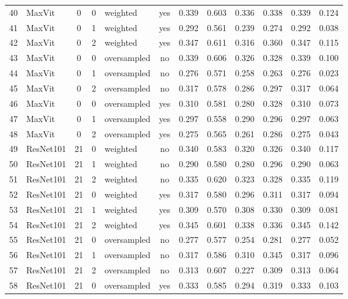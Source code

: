 \documentclass[a4paper,10pt]{book}
\begin{document}
\begin{scriptsize}
\begin{longtable}{@{}l l c c l c c c c c c c@{}}
        40 & MaxVit & 0 & 0 & weighted & yes & 0.339 & 0.603 & 0.336 & 0.338 & 0.339 & 0.124 \\ 
        41 & MaxVit & 0 & 1 & weighted & yes & 0.292 & 0.561 & 0.239 & 0.274 & 0.292 & 0.038 \\ 
        42 & MaxVit & 0 & 2 & weighted & yes & 0.347 & 0.611 & 0.316 & 0.360 & 0.347 & 0.115 \\ 
        43 & MaxVit & 0 & 0 & oversampled & no & 0.339 & 0.606 & 0.326 & 0.328 & 0.339 & 0.100 \\ 
        44 & MaxVit & 0 & 1 & oversampled & no & 0.276 & 0.571 & 0.258 & 0.263 & 0.276 & 0.023 \\ 
        45 & MaxVit & 0 & 2 & oversampled & no & 0.317 & 0.578 & 0.286 & 0.297 & 0.317 & 0.064 \\ 
        46 & MaxVit & 0 & 0 & oversampled & yes & 0.310 & 0.581 & 0.280 & 0.328 & 0.310 & 0.073 \\ 
        47 & MaxVit & 0 & 1 & oversampled & yes & 0.297 & 0.558 & 0.290 & 0.296 & 0.297 & 0.063 \\ 
        48 & MaxVit & 0 & 2 & oversampled & yes & 0.275 & 0.565 & 0.261 & 0.286 & 0.275 & 0.043 \\ 
        49 & ResNet101 & 21 & 0 & weighted & no & 0.340 & 0.583 & 0.320 & 0.326 & 0.340 & 0.117 \\ 
        50 & ResNet101 & 21 & 1 & weighted & no & 0.290 & 0.580 & 0.280 & 0.296 & 0.290 & 0.063 \\ 
        51 & ResNet101 & 21 & 2 & weighted & no & 0.335 & 0.620 & 0.323 & 0.328 & 0.335 & 0.119 \\ 
        52 & ResNet101 & 21 & 0 & weighted & yes & 0.317 & 0.580 & 0.296 & 0.311 & 0.317 & 0.094 \\ 
        53 & ResNet101 & 21 & 1 & weighted & yes & 0.309 & 0.570 & 0.308 & 0.330 & 0.309 & 0.081 \\ 
        54 & ResNet101 & 21 & 2 & weighted & yes & 0.345 & 0.601 & 0.338 & 0.336 & 0.345 & 0.142 \\ 
        55 & ResNet101 & 21 & 0 & oversampled & no & 0.277 & 0.577 & 0.254 & 0.281 & 0.277 & 0.052 \\ 
        56 & ResNet101 & 21 & 1 & oversampled & no & 0.317 & 0.586 & 0.310 & 0.345 & 0.317 & 0.096 \\ 
        57 & ResNet101 & 21 & 2 & oversampled & no & 0.313 & 0.607 & 0.227 & 0.309 & 0.313 & 0.064 \\ 
        58 & ResNet101 & 21 & 0 & oversampled & yes & 0.333 & 0.585 & 0.294 & 0.319 & 0.333 & 0.103 \\ 

\end{longtable}
\end{scriptsize}
\end{document}
